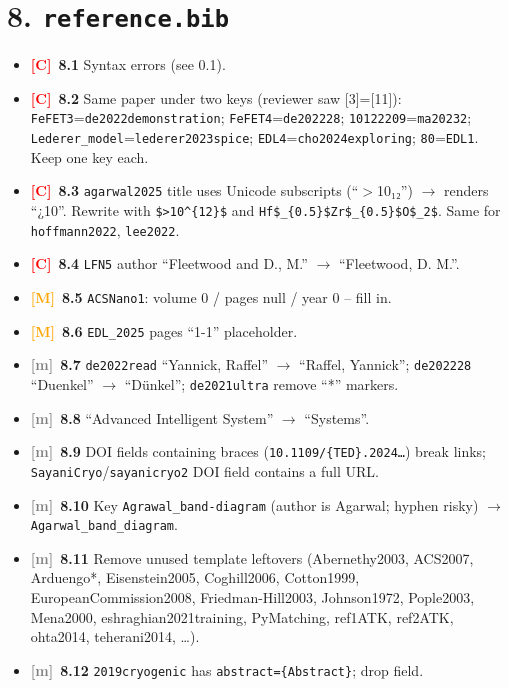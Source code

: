 \documentclass[10pt,a4paper]{article}
\newcommand{\C}{\textcolor{red}{\textbf{[C]}}}
\newcommand{\M}{\textcolor{orange}{\textbf{[M]}}}
\newcommand{\m}{\textcolor{gray}{\textbf{[m]}}}
\begin{document}
\section*{8. \texttt{reference.bib}}
\begin{itemize}
\item \C\ \textbf{8.1} Syntax errors (see 0.1).
\item \C\ \textbf{8.2} Same paper under two keys (reviewer saw [3]=[11]): \texttt{FeFET3}=\texttt{de2022demonstration}; \texttt{FeFET4}=\texttt{de202228}; \texttt{10122209}=\texttt{ma20232}; \texttt{Lederer\_model}=\texttt{lederer2023spice}; \texttt{EDL4}=\texttt{cho2024exploring}; \texttt{80}=\texttt{EDL1}. Keep one key each.
\item \C\ \textbf{8.3} \texttt{agarwal2025} title uses Unicode subscripts (``$>$10₁₂'') $\rightarrow$ renders ``¿10''. Rewrite with \verb|$>10^{12}$| and \verb|Hf$_{0.5}$Zr$_{0.5}$O$_2$|. Same for \texttt{hoffmann2022}, \texttt{lee2022}.
\item \C\ \textbf{8.4} \texttt{LFN5} author ``Fleetwood and D., M.'' $\rightarrow$ ``Fleetwood, D. M.''.
\item \M\ \textbf{8.5} \texttt{ACSNano1}: volume 0 / pages null / year 0 -- fill in.
\item \M\ \textbf{8.6} \texttt{EDL\_2025} pages ``1-1'' placeholder.
\item \m\ \textbf{8.7} \texttt{de2022read} ``Yannick, Raffel'' $\rightarrow$ ``Raffel, Yannick''; \texttt{de202228} ``Duenkel'' $\rightarrow$ ``D\"unkel''; \texttt{de2021ultra} remove ``*'' markers.
\item \m\ \textbf{8.8} ``Advanced Intelligent System'' $\rightarrow$ ``Systems''.
\item \m\ \textbf{8.9} DOI fields containing braces (\texttt{10.1109/\{TED\}.2024\ldots}) break links; \texttt{SayaniCryo}/\texttt{sayanicryo2} DOI field contains a full URL.
\item \m\ \textbf{8.10} Key \texttt{Agrawal\_band-diagram} (author is Agarwal; hyphen risky) $\rightarrow$ \texttt{Agarwal\_band\_diagram}.
\item \m\ \textbf{8.11} Remove unused template leftovers (Abernethy2003, ACS2007, Arduengo*, Eisenstein2005, Coghill2006, Cotton1999, EuropeanCommission2008, Friedman-Hill2003, Johnson1972, Pople2003, Mena2000, eshraghian2021training, PyMatching, ref1ATK, ref2ATK, ohta2014, teherani2014, \ldots).
\item \m\ \textbf{8.12} \texttt{2019cryogenic} has \texttt{abstract=\{Abstract\}}; drop field.
\end{itemize}
\end{document}
